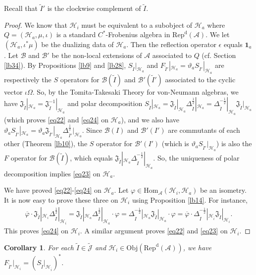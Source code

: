 \documentclass[12pt,a4paper]{article}
\theoremstyle{definition}
\theoremstyle{plain}
\newtheorem{co}[df]{Corollary}
\newcommand{\fk}{\mathfrak}
\newcommand{\mc}{\mathcal}
\newcommand{\wtd}{\widetilde}
\newcommand{\ovl}{\overline}
\newcommand{\id}{\mathbf{1}}
\newcommand{\Hom}{\mathrm{Hom}}
\newcommand{\Jtd}{\widetilde{\mathcal J}}
\newcommand{\RepdA}{\mathrm{Rep}^{\mathrm d}(\mc A)}
\newcommand{\Obj}{\mathrm{Obj}}
\numberwithin{equation}{section}
\begin{document}
Recall that $\wtd I'$ is the clockwise complement of $\wtd I$.
\begin{proof}
We know that $\mc H_i$ must be equivalent to a subobject of $\mc H_a$ where $Q=(\mc H_a,\mu,\iota)$ is a standard $C^*$-Frobenius algebra in $\RepdA$. We let $(\mc H_a,\iota^*\mu)$ be the dualizing data of $\mc H_a$. Then the reflection operator $\epsilon$ equals $\id_a$. Let $\mc B$ and $\mc B'$ be the non-local extensions of $\mc A$ associated to $Q$ (cf. Section \ref{lb34}).  By Propositions \ref{lb9} and \ref{lb28}, $S_{\wtd I}|_{\mc H_a}$ and $F_{\wtd I'}|_{\mc H_a}=\vartheta_aS_{\wtd I'}|_{\mc H_a}$ are respectively the $S$ operators for $\mc B(\wtd I)$ and $\mc B'(\wtd I')$ associated to the cyclic vector $\iota\Omega$.  So, by the Tomita-Takesaki Theory for von-Neumann algebras, we have $\fk J_{\wtd I}|_{\mc H_a}=\fk J_{\wtd I}^{-1}|_{\mc H_a}$ and polar decomposition $S_{\wtd I}|_{\mc H_a}=\fk J_{\wtd I}|_{\mc H_a}\Delta_{\wtd I}^{\frac 12}|_{\mc H_a}=\Delta_{\wtd I}^{-\frac 12}|_{\mc H_a}\fk J_{\wtd I}|_{\mc H_a}$ (which proves \eqref{eq22} and \eqref{eq24} on $\mc H_a$), and we also have $\vartheta_aS_{\wtd I'}|_{\mc H_a}=\vartheta_a\fk J_{\wtd I'}|_{\mc H_a}\Delta_{\wtd I'}^{\frac 12}|_{\mc H_a}$. Since $\mc B(I)$ and $\mc B'(I')$ are commutants of each other (Theorem \ref{lb10}), the $S$ operator for $\mc B'(I')$ (which is $\vartheta_aS_{\wtd I'}|_{\mc H_a}$) is also the $F$ operator for $\mc B(\wtd I)$, which equals $\fk J_{\wtd I}|_{\mc H_a}\Delta_{\wtd I}^{-\frac 12}|_{\mc H_a}$. So, the uniqueness of polar decomposition implies \eqref{eq23} on $\mc H_a$.


We have proved \eqref{eq22}-\eqref{eq24} on $\mc H_a$. Let $\varphi\in\Hom_{\mc A}(\mc H_i,\mc H_a)$ be an isometry. It is now easy to prove these three on $\mc H_i$ using  Proposition \ref{lb14}. For instance,
\begin{align*}
\ovl\varphi\cdot \fk J_{\wtd I}|_{\mc H_i}\Delta_{\wtd I}^{\frac 12}|_{\mc H_i}=	\fk J_{\wtd I}|_{\mc H_a}\Delta_{\wtd I}^{\frac 12}|_{\mc H_a}\cdot \varphi=\Delta_{\wtd I}^{-\frac 12}|_{\mc H_a}\fk J_{\wtd I}|_{\mc H_a}\cdot \varphi=\ovl\varphi\cdot \Delta_{\wtd I}^{-\frac 12}|_{\mc H_{\ovl i}}\fk J_{\wtd I}|_{\mc H_i}.
\end{align*}
This proves \eqref{eq24} on $\mc H_i$. A similar argument proves \eqref{eq22} and \eqref{eq23} on $\mc H_i$.
\end{proof}


\begin{co}\label{lb36}
For each $\wtd I\in\Jtd$ and $\mc H_i\in\Obj(\RepdA)$, we have $F_{\wtd I'}|_{\mc H_i}=(S_{\wtd I}|_{\mc H_{\ovl i}})^*$.
\end{co}
\end{document}
